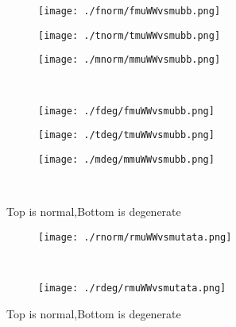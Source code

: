 \documentclass[aps,floats,floatfix,nofootinbib]{revtex4-1}
\begin{document}
\begin{center}
\begin{figure}
\begin{subfigure}{0.3\textwidth}
\texttt{[image: ./fnorm/fmuWWvsmubb.png]}
\label{}
\end{subfigure}
\begin{subfigure}{0.3\textwidth}
\texttt{[image: ./tnorm/tmuWWvsmubb.png]}
\label{}
\end{subfigure}
\begin{subfigure}{0.3\textwidth}
\texttt{[image: ./mnorm/mmuWWvsmubb.png]}
\label{}
\end{subfigure}\\
\begin{subfigure}{0.3\textwidth}
\texttt{[image: ./fdeg/fmuWWvsmubb.png]}
\label{}
\end{subfigure}
\begin{subfigure}{0.3\textwidth}
\texttt{[image: ./tdeg/tmuWWvsmubb.png]}
\label{}
\end{subfigure}
\begin{subfigure}{0.3\textwidth}
\texttt{[image: ./mdeg/mmuWWvsmubb.png]}
\label{}
\end{subfigure}\\
\caption{Top is normal,Bottom is degenerate}
\end{figure}
\end{center}

\begin{center}
\begin{figure}
\begin{subfigure}{0.95\textwidth}
\texttt{[image: ./rnorm/rmuWWvsmutata.png]}
\label{}
\end{subfigure}\\
\begin{subfigure}{0.95\textwidth}
\texttt{[image: ./rdeg/rmuWWvsmutata.png]}
\label{}
\end{subfigure}
\caption{Top is normal,Bottom is degenerate}
\end{figure}
\end{center}
\end{document}
